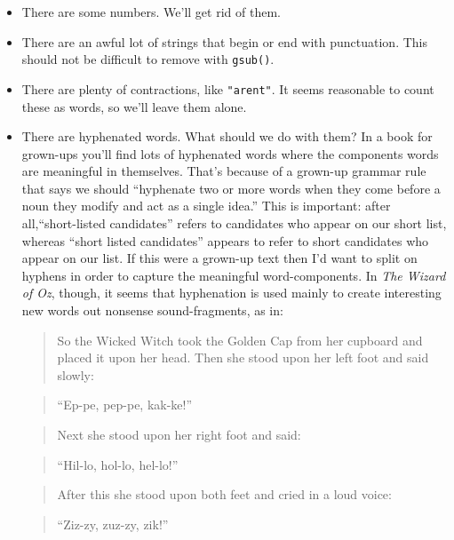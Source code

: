 \documentclass[]{book}
\theoremstyle{definition}
\theoremstyle{definition}
\theoremstyle{remark}
\begin{document}
{\begin{itemize}
\item
  There are some numbers. We'll get rid of them.
\item
  There are an awful lot of strings that begin or end with punctuation.
  This should not be difficult to remove with \texttt{gsub()}.
\item
  There are plenty of contractions, like
  \texttt{"aren\textquotesingle{}t"}. It seems reasonable to count these
  as words, so we'll leave them alone.
\item
  There are hyphenated words. What should we do with them? In a book for
  grown-ups you'll find lots of hyphenated words where the components
  words are meaningful in themselves. That's because of a grown-up
  grammar rule that says we should ``hyphenate two or more words when
  they come before a noun they modify and act as a single idea.'' This
  is important: after all,``short-listed candidates'' refers to
  candidates who appear on our short list, whereas ``short listed
  candidates'' appears to refer to short candidates who appear on our
  list. If this were a grown-up text then I'd want to split on hyphens
  in order to capture the meaningful word-components. In \emph{The
  Wizard of Oz}, though, it seems that hyphenation is used mainly to
  create interesting new words out nonsense sound-fragments, as in:

  \begin{quote}
  So the Wicked Witch took the Golden Cap from her cupboard and placed
  it upon her head. Then she stood upon her left foot and said slowly:
  \end{quote}

  \begin{quote}
  ``Ep-pe, pep-pe, kak-ke!''
  \end{quote}

  \begin{quote}
  Next she stood upon her right foot and said:
  \end{quote}

  \begin{quote}
  ``Hil-lo, hol-lo, hel-lo!''
  \end{quote}

  \begin{quote}
  After this she stood upon both feet and cried in a loud voice:
  \end{quote}

  \begin{quote}
  ``Ziz-zy, zuz-zy, zik!''
  \end{quote}


\end{itemize}}
\end{document}

